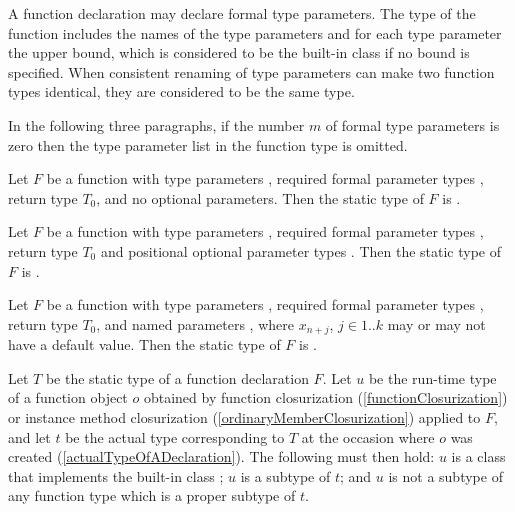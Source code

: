 \documentclass[makeidx]{article}
\begin{document}
\LMHash{}%
A function declaration may declare formal type parameters.
The type of the function includes the names of the type parameters
and for each type parameter the upper bound,
which is considered to be the built-in class  if no bound is specified.
When consistent renaming of type parameters can make two function types identical,
they are considered to be the same type.


\LMHash{}%
In the following three paragraphs,
if the number $m$ of formal type parameters is zero then
the type parameter list in the function type is omitted.

\LMHash{}%
Let $F$ be a function with
type parameters \TypeParametersStd,
required formal parameter types ,
return type $T_0$,
and no optional parameters.
Then the static type of $F$ is
.

\LMHash{}%
Let $F$ be a function with
type parameters \TypeParametersStd,
required formal parameter types  ,
return type $T_0$
and positional optional parameter types .
Then the static type of $F$ is
.

\LMHash{}%
Let $F$ be a function with
type parameters \TypeParametersStd,
required formal parameter types ,
return type $T_0$,
and named parameters ,
where $x_{n+j}$, $j \in 1 .. k$ may or may not have a default value.
Then the static type of $F$ is
.

\LMHash{}%
Let $T$ be the static type of a function declaration $F$.
Let $u$ be the run-time type of a function object $o$ obtained by
function closurization
(\ref{functionClosurization})
or instance method closurization
(\ref{ordinaryMemberClosurization})
applied to $F$,
and let $t$ be the actual type corresponding to $T$
at the occasion where $o$ was created
(\ref{actualTypeOfADeclaration}).
The following must then hold:
$u$ is a class that implements the built-in class \FUNCTION{};
$u$ is a subtype of $t$;
and $u$ is not a subtype of any function type which is a proper subtype of $t$.
\end{document}
